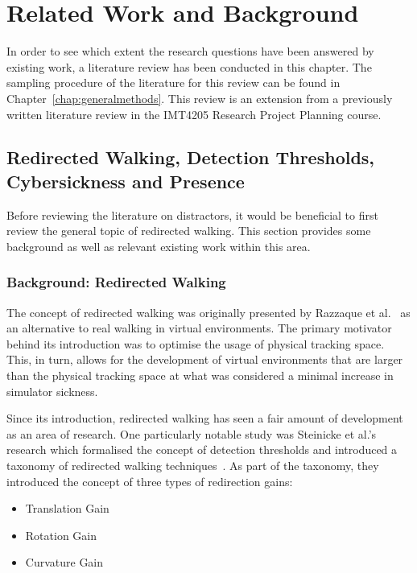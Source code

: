 \chapter{Related Work and Background}\label{chap:relatedWork}
In order to see which extent the research questions have been answered by existing work, a literature review has been conducted in this chapter. The sampling procedure of the literature for this review can be found in Chapter~\ref{chap:generalmethods}. This review is an extension from a previously written literature review in the IMT4205 Research Project Planning course. 

\section{Redirected Walking, Detection Thresholds, Cybersickness and Presence}
Before reviewing the literature on distractors, it would be beneficial to first review the general topic of redirected walking. This section provides some background as well as relevant existing work within this area.

\subsection{Background: Redirected Walking}
The concept of redirected walking was originally presented by Razzaque et al.~\cite{razzaque2001redirected} as an alternative to real walking in virtual environments. The primary motivator behind its introduction was to optimise the usage of physical tracking space. This, in turn, allows for the development of virtual environments that are larger than the physical tracking space at what was considered a minimal increase in simulator sickness. 

Since its introduction, redirected walking has seen a fair amount of development as an area of research. One particularly notable study was Steinicke et al.'s research which formalised the concept of detection thresholds and introduced a taxonomy of redirected walking techniques~\cite{5072212}. As part of the taxonomy, they introduced the concept of three types of redirection gains:
\begin{itemize}
    \item Translation Gain
    \item Rotation Gain
    \item Curvature Gain
\end{itemize}

